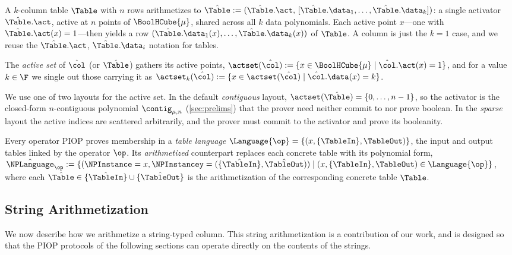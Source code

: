 A $k$-column table $\Table$ with $n$ rows arithmetizes to $\hat{\Table} := (\hat{\Table}.\act,\, [\hat{\Table}.\data_1, \dots, \hat{\Table}.\data_k])$: a single activator $\hat{\Table}.\act$, active at $n$ points of $\BoolHCube{\mu}$, shared across all $k$ data polynomials. Each active point $x$---one with $\hat{\Table}.\act(x) = 1$---then yields a row $(\hat{\Table}.\data_1(x),\dots,\hat{\Table}.\data_k(x))$ of $\Table$. A column is just the $k=1$ case, and we reuse the $\hat{\Table}.\act$, $\hat{\Table}.\data_i$ notation for tables.

The \emph{active set} of $\hat{\col}$ (or $\hat{\Table}$) gathers its active points, $\actset(\hat{\col}) := \{x \in \BoolHCube{\mu} \mid \hat{\col}.\act(x) = 1\}$, and for a value $k \in \F$ we single out those carrying it as $\actset_k(\hat{\col}) := \{x \in \actset(\hat{\col}) \mid \hat{\col}.\data(x) = k\}$.

We use one of two layouts for the active set. In the default \emph{contiguous} layout, $\actset(\hat\Table) = \{0, \dots, n - 1\}$, so the activator is the closed-form $n$-contiguous polynomial $\contig_{\mu,n}$ (\cref{sec:prelims}) that the prover need neither commit to nor prove boolean. In the \emph{sparse} layout the active indices are scattered arbitrarily, and the prover must commit to the activator and prove its booleanity.


Every operator PIOP proves membership in a \emph{table language}
$\Language{\op} = \{(x, \{\TableIn\}, \TableOut)\}$, the input and output tables linked by the operator $\op$. Its \emph{arithmetized} counterpart replaces each concrete table with its polynomial form, $
\hat{\NPLanguage}_{\op} := \{
    (\NPInstance = x,
    \NPInstancey = (\{\hat{\TableIn}\}, \hat{\TableOut}))
  \;|\;
  (x, \{\TableIn\}, \TableOut) \in \Language{\op}
\}
$,
where each $\hat{\Table} \in \{\hat{\TableIn}\} \cup \{\hat{\TableOut}\}$ is the arithmetization of the corresponding concrete table $\Table$.

\subsection{String Arithmetization}
\label{sec:string-arith}

We now describe how we arithmetize a string-typed column. This string arithmetization is a contribution of our work, and is designed so that the PIOP protocols of the following sections can operate directly on the contents of the strings.

